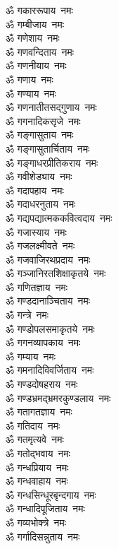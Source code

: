 \begin{flushleft}
\begin{multicols}{2}
ॐ गकाररूपाय~नमः\\
ॐ गम्बीजाय~नमः\\
ॐ गणेशाय~नमः\\
ॐ गणवन्दिताय~नमः\\
ॐ गणनीयाय~नमः\\
ॐ गणाय~नमः\\
ॐ गण्याय~नमः\\
ॐ गणनातीतसद्गुणाय~नमः\\
ॐ गगनादिकसृजे~नमः\\
ॐ गङ्गासुताय~नमः\hfill{}\\
ॐ गङ्गासुतार्चिताय~नमः\\
ॐ गङ्गाधरप्रीतिकराय~नमः\\
ॐ गवीशेड्याय~नमः\\
ॐ गदापहाय~नमः\\
ॐ गदाधरनुताय~नमः\\
ॐ गद्यपद्यात्मककवित्वदाय~नमः\\
ॐ गजास्याय~नमः\\
ॐ गजलक्ष्मीवते~नमः\\
ॐ गजवाजिरथप्रदाय~नमः\\
ॐ गञ्जानिरतशिक्षाकृतये~नमः\hfill{}\\
ॐ गणितज्ञाय~नमः\\
ॐ गण्डदानाञ्चिताय~नमः\\
ॐ गन्त्रे~नमः\\
ॐ गण्डोपलसमाकृतये~नमः\\
ॐ गगनव्यापकाय~नमः\\
ॐ गम्याय~नमः\\
ॐ गमनादिविवर्जिताय~नमः\\
ॐ गण्डदोषहराय~नमः\\
ॐ गण्डभ्रमद्भ्रमरकुण्डलाय~नमः\\
ॐ गतागतज्ञाय~नमः\hfill{}\\
ॐ गतिदाय~नमः\\
ॐ गतमृत्यवे~नमः\\
ॐ गतोद्भवाय~नमः\\
ॐ गन्धप्रियाय~नमः\\
ॐ गन्धवाहाय~नमः\\
ॐ गन्धसिन्धूरबृन्दगाय~नमः\\
ॐ गन्धादिपूजिताय~नमः\\
ॐ गव्यभोक्त्रे~नमः\\
ॐ गर्गादिसन्नुताय~नमः\\

\end{multicols}
\end{flushleft}
